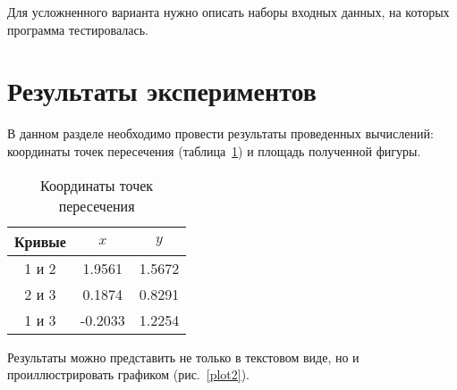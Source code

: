 \documentclass[a4paper,12pt,titlepage,final]{article}
\begin{document}
Для усложненного варианта нужно описать наборы входных данных, на которых
программа тестировалась.

\newpage

\section{Результаты экспериментов}

В данном разделе необходимо провести результаты проведенных вычислений:
координаты точек пересечения (таблица~\ref{table1}) и площадь полученной фигуры.

\begin{table}[h]
\centering
\begin{tabular}{|c|c|c|}
\hline
Кривые & $x$ & $y$ \\
\hline
1 и 2 &  1.9561 & 1.5672 \\
2 и 3 &  0.1874 & 0.8291 \\
1 и 3 & -0.2033 & 1.2254 \\
\hline
\end{tabular}
\caption{Координаты точек пересечения}
\label{table1}
\end{table}


Результаты можно представить не только в текстовом виде, но и 
проиллюстрировать графиком (рис.~\ref{plot2}).
\end{document}
